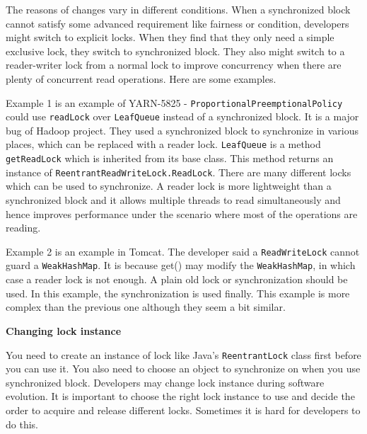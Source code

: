 The reasons of changes vary in different conditions. When a synchronized block cannot satisfy some advanced requirement like fairness or condition, developers might switch to explicit locks. When they find that they only need a simple exclusive lock, they switch to synchronized block. They also might switch to a reader-writer lock \cite{journals/cacm/CouroisHP71} from a normal lock to improve concurrency when there are plenty of concurrent read operations. Here are some examples.


Example 1 is an example of YARN-5825 - \texttt{ProportionalPreemptionalPolicy} could use \texttt{readLock} over \texttt{LeafQueue} instead of a synchronized block. It is a major bug of Hadoop project. They used a synchronized block to synchronize in various places, which can be replaced with a reader lock. \texttt{LeafQueue} is a method \texttt{getReadLock} which is inherited from its base class. This method returns an instance of \texttt{ReentrantReadWriteLock.ReadLock}. There are many different locks which can be used to synchronize. A reader lock is more lightweight than a synchronized block and it allows multiple threads to read simultaneously and hence improves performance under the scenario where most of the operations are reading.


Example 2 is an example in Tomcat. The developer said a \texttt{ReadWriteLock} cannot guard a \texttt{WeakHashMap}. It is because get() may modify the \texttt{WeakHashMap}, in which case a reader lock is not enough. A plain old lock or synchronization should be used. In this example, the synchronization is used finally. This example is more complex than the previous one although they seem a bit similar. %

\textbf{Changing lock instance}

You need to create an instance of lock like Java's \texttt{ReentrantLock} class first before you can use it. You also need to choose an object to synchronize on when you use synchronized block. Developers may change lock instance during software evolution. It is important to choose the right lock instance to use and decide the order to acquire and release different locks. Sometimes it is hard for developers to do this.

